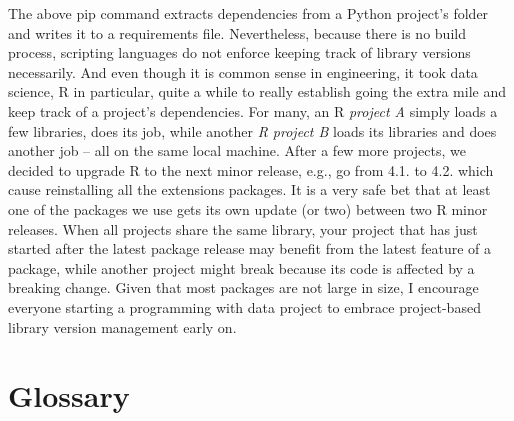 \documentclass[
  12pt,
  letterpaper,
]{krantz}
\begin{document}
The above pip command extracts dependencies from a Python project's
folder and writes it to a requirements file. Nevertheless, because there
is no build process, scripting languages do not enforce keeping track of
library versions necessarily. And even though it is common sense in
engineering, it took data science, R in particular, quite a while to
really establish going the extra mile and keep track of a project's
dependencies. For many, an R \emph{project A} simply loads a few
libraries, does its job, while another \emph{R project B} loads its
libraries and does another job -- all on the same local machine. After a
few more projects, we decided to upgrade R to the next minor release,
e.g., go from 4.1. to 4.2. which cause reinstalling all the extensions
packages. It is a very safe bet that at least one of the packages we use
gets its own update (or two) between two R minor releases. When all
projects share the same library, your project that has just started
after the latest package release may benefit from the latest feature of
a package, while another project might break because its code is
affected by a breaking change. Given that most packages are not large in
size, I encourage everyone starting a programming with data project to
embrace project-based library version management early on.


\hypertarget{glossary}{%
\chapter*{Glossary}\label{glossary}}

\end{document}
